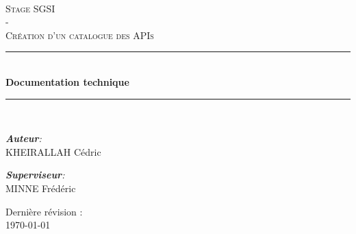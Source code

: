 \begin{titlepage}

    \newcommand{\HRule}{\rule{\linewidth}{0.5mm}} %
    \center 
     
    \vspace*{0.8cm}
    \\[1cm]
    
    \textsc{\Large Stage SGSI\\ - \\ \bigskip Création d'un catalogue des APIs}\\[1.5cm] %
    
    \HRule \\[0.8cm]
    
    {\huge \bfseries Documentation technique}\\[0.7cm] %
    
    \HRule \\[1.5cm]
    
    
    \large
    

    \emph{\textbf{Auteur}:}\\
    KHEIRALLAH Cédric\\

    \vspace{1cm}

    \emph{\textbf{Superviseur}:}\\
    MINNE Frédéric\\

    \vfill
    
    Dernière révision : \\
    \large \today
    
\end{titlepage}